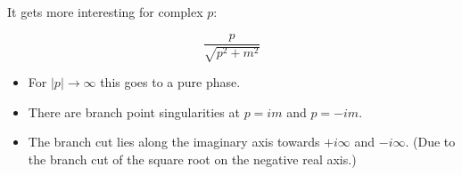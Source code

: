 \documentclass{beamer}
\newcommand{\sqrtpm}{\sqrt{p^2 + m^2}}
\newcommand{\envelope}{\frac{p}{\sqrtpm}}
\begin{document}



\begin{frame}
It gets more interesting for complex $p$:

$$\envelope$$

\begin{itemize}

\pause
\item For $|p| \rightarrow \infty$ this goes to  a pure phase.

\pause
\item There are branch point \alert{singularities} at $p = im$ and $p = -im$.

\pause
\item The \alert{branch cut} lies along the imaginary axis towards $+i\infty$ and $-i\infty$.
(Due to the branch cut of the square root on the negative real axis.)
\end{itemize}
\end{frame}



\end{document}
